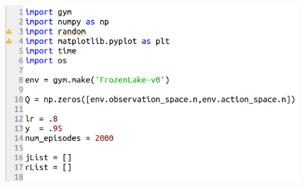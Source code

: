 \begin{figure}[ht]
	\centering
	\includegraphics*[width=15cm,height=20cm,keepaspectratio]{figuras/q_table_1} 
	\label{fig:formula Q-Tables}
\end{figure}

